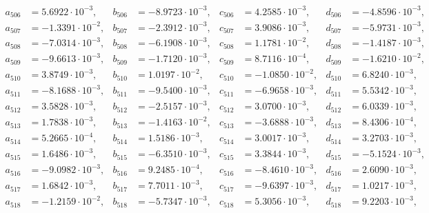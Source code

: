\begin{align*}
  a_{ 506 } &= 5.6922 \cdot 10^{ -3 }, & b_{ 506 } &= -8.9723 \cdot 10^{ -3 }, & c_{ 506 } &= 4.2585 \cdot 10^{ -3 }, & d_{ 506 } &= -4.8596 \cdot 10^{ -3 }, \\ 
  a_{ 507 } &= -1.3391 \cdot 10^{ -2 }, & b_{ 507 } &= -2.3912 \cdot 10^{ -3 }, & c_{ 507 } &= 3.9086 \cdot 10^{ -3 }, & d_{ 507 } &= -5.9731 \cdot 10^{ -3 }, \\ 
  a_{ 508 } &= -7.0314 \cdot 10^{ -3 }, & b_{ 508 } &= -6.1908 \cdot 10^{ -3 }, & c_{ 508 } &= 1.1781 \cdot 10^{ -2 }, & d_{ 508 } &= -1.4187 \cdot 10^{ -3 }, \\ 
  a_{ 509 } &= -9.6613 \cdot 10^{ -3 }, & b_{ 509 } &= -1.7120 \cdot 10^{ -3 }, & c_{ 509 } &= 8.7116 \cdot 10^{ -4 }, & d_{ 509 } &= -1.6210 \cdot 10^{ -2 }, \\ 
  a_{ 510 } &= 3.8749 \cdot 10^{ -3 }, & b_{ 510 } &= 1.0197 \cdot 10^{ -2 }, & c_{ 510 } &= -1.0850 \cdot 10^{ -2 }, & d_{ 510 } &= 6.8240 \cdot 10^{ -3 }, \\ 
  a_{ 511 } &= -8.1688 \cdot 10^{ -3 }, & b_{ 511 } &= -9.5400 \cdot 10^{ -3 }, & c_{ 511 } &= -6.9658 \cdot 10^{ -3 }, & d_{ 511 } &= 5.5342 \cdot 10^{ -3 }, \\ 
  a_{ 512 } &= 3.5828 \cdot 10^{ -3 }, & b_{ 512 } &= -2.5157 \cdot 10^{ -3 }, & c_{ 512 } &= 3.0700 \cdot 10^{ -3 }, & d_{ 512 } &= 6.0339 \cdot 10^{ -3 }, \\ 
  a_{ 513 } &= 1.7838 \cdot 10^{ -3 }, & b_{ 513 } &= -1.4163 \cdot 10^{ -2 }, & c_{ 513 } &= -3.6888 \cdot 10^{ -3 }, & d_{ 513 } &= 8.4306 \cdot 10^{ -4 }, \\ 
  a_{ 514 } &= 5.2665 \cdot 10^{ -4 }, & b_{ 514 } &= 1.5186 \cdot 10^{ -3 }, & c_{ 514 } &= 3.0017 \cdot 10^{ -3 }, & d_{ 514 } &= 3.2703 \cdot 10^{ -3 }, \\ 
  a_{ 515 } &= 1.6486 \cdot 10^{ -3 }, & b_{ 515 } &= -6.3510 \cdot 10^{ -3 }, & c_{ 515 } &= 3.3844 \cdot 10^{ -3 }, & d_{ 515 } &= -5.1524 \cdot 10^{ -3 }, \\ 
  a_{ 516 } &= -9.0982 \cdot 10^{ -3 }, & b_{ 516 } &= 9.2485 \cdot 10^{ -4 }, & c_{ 516 } &= -8.4610 \cdot 10^{ -3 }, & d_{ 516 } &= 2.6090 \cdot 10^{ -3 }, \\ 
  a_{ 517 } &= 1.6842 \cdot 10^{ -3 }, & b_{ 517 } &= 7.7011 \cdot 10^{ -3 }, & c_{ 517 } &= -9.6397 \cdot 10^{ -3 }, & d_{ 517 } &= 1.0217 \cdot 10^{ -3 }, \\ 
  a_{ 518 } &= -1.2159 \cdot 10^{ -2 }, & b_{ 518 } &= -5.7347 \cdot 10^{ -3 }, & c_{ 518 } &= 5.3056 \cdot 10^{ -3 }, & d_{ 518 } &= 9.2203 \cdot 10^{ -3 }, \\ 

\end{align*}
